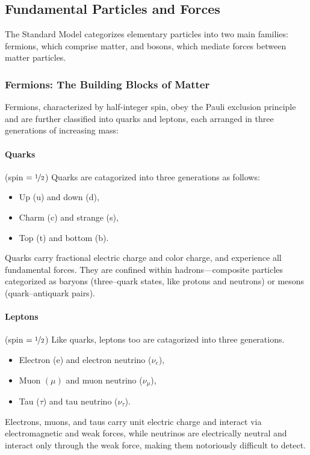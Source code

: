 \begin{definition}
\subsection{Fundamental Particles and Forces}
The Standard Model categorizes elementary particles into two main families: fermions, which comprise matter, and bosons, which mediate forces between matter particles.
\subsubsection{Fermions: The Building Blocks of Matter}
Fermions, characterized by half-integer spin, obey the Pauli exclusion principle and are further classified into quarks and leptons, each arranged in three generations of increasing mass:
\paragraph{Quarks} (spin $ = \nicefrac{1}{2}$)
Quarks are catagorized into three generations as follows:
\begin{itemize}
    \item Up (u) and down (d),
    \item Charm (c) and strange (s),
    \item Top (t) and bottom (b).
\end{itemize}

Quarks carry fractional electric charge and color charge, and experience all fundamental forces.
%
They are confined within hadrons---composite particles categorized as baryons (three--quark states, like protons and neutrons) or mesons (quark--antiquark pairs).

\paragraph{Leptons} (spin $ = \nicefrac{1}{2}$)
Like quarks, leptons too are catagorized into three generations.
\begin{itemize}
    \item Electron (e) and electron neutrino ($\nu_e$),
    \item Muon $(\mu)$ and muon neutrino ($\nu_\mu$),
    \item Tau ($\tau$) and tau neutrino ($\nu_\tau$).
\end{itemize}

Electrons, muons, and taus carry unit electric charge and interact via electromagnetic and weak forces, while neutrinos are electrically neutral and interact only through the weak force, making them notoriously difficult to detect.


\end{definition}
